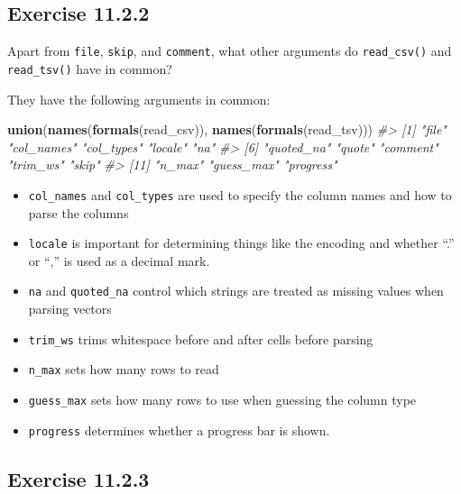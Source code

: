\documentclass[]{book}
\newenvironment{Shaded}{\begin{snugshade}}{\end{snugshade}}
\newcommand{\CommentTok}[1]{\textcolor[rgb]{0.56,0.35,0.01}{\textit{#1}}}
\newcommand{\KeywordTok}[1]{\textcolor[rgb]{0.13,0.29,0.53}{\textbf{#1}}}
\newcommand{\NormalTok}[1]{#1}
\providecommand{\tightlist}{%
  \setlength{\itemsep}{0pt}\setlength{\parskip}{0pt}}
\theoremstyle{plain}
\theoremstyle{remark}
\theoremstyle{definition}
\theoremstyle{definition}
\theoremstyle{definition}
\theoremstyle{remark}
\begin{document}
\hypertarget{exercise-11.2.2}{%
\subsection*{\texorpdfstring{Exercise
{11.2.2}}{Exercise 11.2.2}}\label{exercise-11.2.2}}

Apart from \texttt{file}, \texttt{skip}, and \texttt{comment}, what
other arguments do \texttt{read\_csv()} and \texttt{read\_tsv()} have in
common?

They have the following arguments in common:

\begin{Shaded}
\begin{Highlighting}[]
\KeywordTok{union}\NormalTok{(}\KeywordTok{names}\NormalTok{(}\KeywordTok{formals}\NormalTok{(read_csv)), }\KeywordTok{names}\NormalTok{(}\KeywordTok{formals}\NormalTok{(read_tsv)))}
\CommentTok{#>  [1] "file"      "col_names" "col_types" "locale"    "na"       }
\CommentTok{#>  [6] "quoted_na" "quote"     "comment"   "trim_ws"   "skip"     }
\CommentTok{#> [11] "n_max"     "guess_max" "progress"}
\end{Highlighting}
\end{Shaded}

\begin{itemize}
\tightlist
\item
  \texttt{col\_names} and \texttt{col\_types} are used to specify the
  column names and how to parse the columns
\item
  \texttt{locale} is important for determining things like the encoding
  and whether ``.'' or ``,'' is used as a decimal mark.
\item
  \texttt{na} and \texttt{quoted\_na} control which strings are treated
  as missing values when parsing vectors
\item
  \texttt{trim\_ws} trims whitespace before and after cells before
  parsing
\item
  \texttt{n\_max} sets how many rows to read
\item
  \texttt{guess\_max} sets how many rows to use when guessing the column
  type
\item
  \texttt{progress} determines whether a progress bar is shown.
\end{itemize}

\hypertarget{exercise-11.2.3}{%
\subsection*{\texorpdfstring{Exercise
{11.2.3}}{Exercise 11.2.3}}\label{exercise-11.2.3}}
\end{document}

